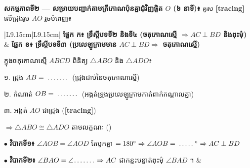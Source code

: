\documentclass[a4paper,10pt]{article}
\newcommand{\tri}[1]{\ensuremath{\triangle #1}}
\newcommand{\ang}[1]{\ensuremath{\angle #1}}
\newcommand{\cg}{\ensuremath{\cong}}
\newcommand{\dotline}[1]{\makebox[#1]{\dotfill}}
\begin{document}
\vspace{5pt}
\textbf{សកម្មភាពទី២ — សម្រាយបញ្ជាក់តាមត្រីកោណប៉ុនគ្នាជុំវិញផ្ចិត $O$ (៦ នាទី)៖} គូស \textbf{[tracing]} លើជ្រុងរួម $AO$ រួចបំពេញ៖\par\vspace{3pt}
{\renewcommand{\arraystretch}{1.22}
\begin{tabular}{|L{9.15cm}|L{9.15cm}|}
  \hline
  \textbf{ផ្នែក ក៖ ទ្រឹស្ដីបទទី២ និងទី៤ (ចតុកោណស្មើ $\Rightarrow AC\perp BD$ និងពុះមុំ)} & \textbf{ផ្នែក ខ៖ ទ្រឹស្ដីបទទី៣ (ប្រលេឡូក្រាមមាន $AC\perp BD \Rightarrow$ ចតុកោណស្មើ)} \\
  \hline
  \begin{center}
  \vspace{-2pt}
  \vspace{-3pt}
  \end{center}
  ក្នុងចតុកោណស្មើ $ABCD$ ពិនិត្យ $\tri{ABO}$ និង $\tri{ADO}$៖\par
  ១. ជ្រុង $AB = \dotline{1.2cm}$ (ជ្រុងជាប់នៃចតុកោណស្មើ)\par
  ២. កំណាត់ $OB = \dotline{1.2cm}$ (អង្កត់ទ្រូងប្រលេឡូក្រាមកាត់ពាក់កណ្ដាលគ្នា)\par
  ៣. អង្កត់ $AO$ ជាជ្រុង \dotline{1.5cm} (\textbf{[tracing]})\par
  $\Rightarrow \tri{ABO} \cg \tri{ADO}$ តាមលក្ខណៈ (\dotline{1.4cm})\par
  $\bullet$ \textbf{វិបាកទី១៖} $\ang{AOB}=\ang{AOD}$ តែបូកគ្នា $=180^\circ \Rightarrow \ang{AOB}=\dotline{0.9cm}^\circ \Rightarrow AC\perp BD$\par
  $\bullet$ \textbf{វិបាកទី២៖} $\ang{BAO}=\ang{\dotline{1.1cm}} \Rightarrow AC$ ជាកន្លះបន្ទាត់ពុះមុំ $\ang{BAD}$ ។
  &
  \begin{center}
  \vspace{-2pt}
  \begin{tikzpicture}[scale=0.68, every node/.style={font=\scriptsize}]

\end{tikzpicture}
\end{center}
\end{tabular}}
\end{document}

